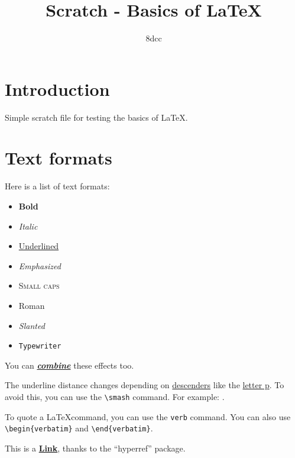 \documentclass{article}
\title{Scratch - Basics of \LaTeX}
\author{8dcc}
\date{}
\begin{document}
\maketitle
\tableofcontents
\clearpage

\section{Introduction}

Simple scratch file for testing the basics of \LaTeX.

\section{Text formats}

Here is a list of text formats:

\begin{itemize}
  \item \textbf{Bold}
  \item \textit{Italic}
  \item \underline{Underlined}
  \item \emph{Emphasized}
  \item \textsc{Small caps}
  \item \textrm{Roman}
  \item \textsl{Slanted}
  \item \texttt{Typewriter}
\end{itemize}

You can \underline{\textbf{\textit{combine}}} these effects too.

The underline distance changes depending on \underline{descenders} like the
\underline{letter p}. To avoid this, you can use the \verb|\smash| command. For
example: \underline{}.

To quote a \LaTeX command, you can use the \verb|verb| command. You can also use
\verb|\begin{verbatim}| and \verb|\end{verbatim}|.

This is a \href{http://github.com/8dcc}{\textbf{Link}}, thanks to the
``hyperref'' package.

\end{document}
